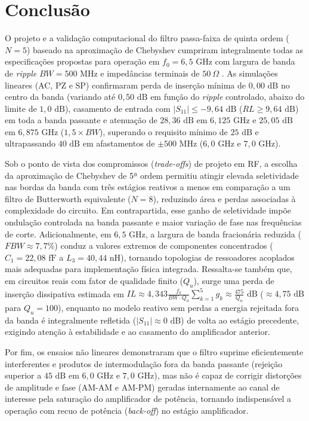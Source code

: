 \section{Conclusão}

O projeto e a validação computacional do filtro passa-faixa de quinta ordem ($N=5$) baseado na aproximação de Chebyshev cumpriram integralmente todas as especificações propostas para operação em $f_0 = 6{,}5\text{ GHz}$ com largura de banda de \textit{ripple} $BW = 500\text{ MHz}$ e impedâncias terminais de $50~\Omega$ \cite{Filter1}. As simulações lineares (AC, PZ e SP) confirmaram perda de inserção mínima de $0{,}00\text{ dB}$ no centro da banda (variando até $0{,}50\text{ dB}$ em função do \textit{ripple} controlado, abaixo do limite de $1{,}0\text{ dB}$), casamento de entrada com $|S_{11}| \le -9{,}64\text{ dB}$ ($RL \ge 9{,}64\text{ dB}$) em toda a banda passante e atenuação de $28{,}36\text{ dB}$ em $6{,}125\text{ GHz}$ e $25{,}05\text{ dB}$ em $6{,}875\text{ GHz}$ ($1{,}5 \times BW$), superando o requisito mínimo de $25\text{ dB}$ e ultrapassando $40\text{ dB}$ em afastamentos de $\pm 500\text{ MHz}$ ($6{,}0\text{ GHz}$ e $7{,}0\text{ GHz}$).

Sob o ponto de vista dos compromissos (\textit{trade-offs}) de projeto em RF, a escolha da aproximação de Chebyshev de 5ª ordem permitiu atingir elevada seletividade nas bordas da banda com três estágios reativos a menos em comparação a um filtro de Butterworth equivalente ($N = 8$), reduzindo área e perdas associadas à complexidade do circuito. Em contrapartida, esse ganho de seletividade impõe ondulação controlada na banda passante e maior variação de fase nas frequências de corte. Adicionalmente, em $6{,}5\text{ GHz}$, a largura de banda fracionária reduzida ($FBW \approx 7{,}7\%$) conduz a valores extremos de componentes concentrados ($C_1 = 22{,}08\text{ fF}$ a $L_3 = 40{,}44\text{ nH}$), tornando topologias de ressoadores acoplados mais adequadas para implementação física integrada. Ressalta-se também que, em circuitos reais com fator de qualidade finito ($Q_u$), surge uma perda de inserção dissipativa estimada em $IL \approx 4{,}343 \frac{f_0}{BW \cdot Q_u} \sum_{k=1}^{5} g_k \approx \frac{475}{Q_u}\text{ dB}$ ($\approx 4{,}75\text{ dB}$ para $Q_u = 100$), enquanto no modelo reativo sem perdas a energia rejeitada fora da banda é integralmente refletida ($|S_{11}| \approx 0\text{ dB}$) de volta ao estágio precedente, exigindo atenção à estabilidade e ao casamento do amplificador anterior.

Por fim, os ensaios não lineares demonstraram que o filtro suprime eficientemente interferentes e produtos de intermodulação fora da banda passante (rejeição superior a $45\text{ dB}$ em $6{,}0\text{ GHz}$ e $7{,}0\text{ GHz}$), mas não é capaz de corrigir distorções de amplitude e fase (AM-AM e AM-PM) geradas internamente ao canal de interesse pela saturação do amplificador de potência, tornando indispensável a operação com recuo de potência (\textit{back-off}) no estágio amplificador.

